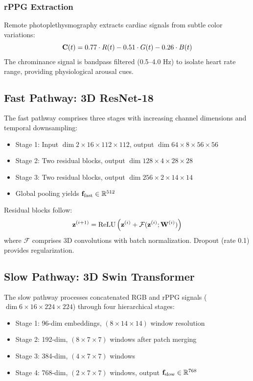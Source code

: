 \subsubsection{rPPG Extraction}

Remote photoplethysmography extracts cardiac signals from subtle color variations:
\begin{equation}
\mathbf{C}(t) = 0.77 \cdot R(t) - 0.51 \cdot G(t) - 0.26 \cdot B(t)
\end{equation}
The chrominance signal is bandpass filtered (0.5--4.0 Hz) to isolate heart rate range, providing physiological arousal cues.

\subsection{Fast Pathway: 3D ResNet-18}

The fast pathway comprises three stages with increasing channel dimensions and temporal downsampling:
\begin{itemize}
\item Stage 1: Input $\dim{2\times 16 \times 112 \times 112}$, output $\dim{64 \times 8 \times 56 \times 56}$
\item Stage 2: Two residual blocks, output $\dim{128 \times 4 \times 28 \times 28}$
\item Stage 3: Two residual blocks, output $\dim{256 \times 2 \times 14 \times 14}$
\item Global pooling yields $\mathbf{f}_{\text{fast}} \in \mathbb{R}^{512}$
\end{itemize}

Residual blocks follow:
\begin{equation}
\mathbf{z}^{(i+1)} = \mathrm{ReLU}\left( \mathbf{z}^{(i)} + \mathcal{F}(\mathbf{z}^{(i)}; \mathbf{W}^{(i)}) \right)
\end{equation}
where $\mathcal{F}$ comprises 3D convolutions with batch normalization. Dropout (rate 0.1) provides regularization.

\subsection{Slow Pathway: 3D Swin Transformer}

The slow pathway processes concatenated RGB and rPPG signals ($\dim{6 \times 16 \times 224 \times 224}$) through four hierarchical stages:
\begin{itemize}
\item Stage 1: 96-dim embeddings, $(8 \times 14 \times 14)$ window resolution
\item Stage 2: 192-dim, $(8 \times 7 \times 7)$ windows after patch merging
\item Stage 3: 384-dim, $(4 \times 7 \times 7)$ windows
\item Stage 4: 768-dim, $(2 \times 7 \times 7)$ windows, output $\mathbf{f}_{\text{slow}} \in \mathbb{R}^{768}$
\end{itemize}

